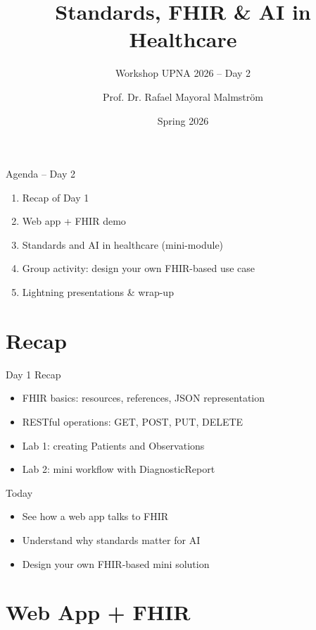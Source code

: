 \documentclass[aspectratio=1610]{beamer}
\title[Standards \& AI]{Standards, FHIR \& AI in Healthcare}
\subtitle{Workshop UPNA 2026 -- Day 2}
\author{Prof. Dr. Rafael Mayoral Malmström}
\institute[Kempten UAS]{Hochschule Kempten -- University of Applied Sciences}
\date{Spring 2026}
\begin{document}
	
	\begin{frame}
		\titlepage
	\end{frame}
	
	\begin{frame}{Agenda -- Day 2}
		\begin{enumerate}
			\item Recap of Day 1
			\item Web app + FHIR demo
			\item Standards and AI in healthcare (mini-module)
			\item Group activity: design your own FHIR-based use case
			\item Lightning presentations \& wrap-up
		\end{enumerate}
	\end{frame}
	
	\section{Recap}
	
	\begin{frame}{Day 1 Recap}
		\begin{itemize}
			\item FHIR basics: resources, references, JSON representation
			\item RESTful operations: GET, POST, PUT, DELETE
			\item Lab 1: creating Patients and Observations
			\item Lab 2: mini workflow with DiagnosticReport
		\end{itemize}
		\vspace{0.5em}
		\begin{block}{Today}
			\begin{itemize}
				\item See how a web app talks to FHIR
				\item Understand why standards matter for AI
				\item Design your own FHIR-based mini solution
			\end{itemize}
		\end{block}
	\end{frame}
	
	\section{Web App + FHIR}
	
\end{document}
